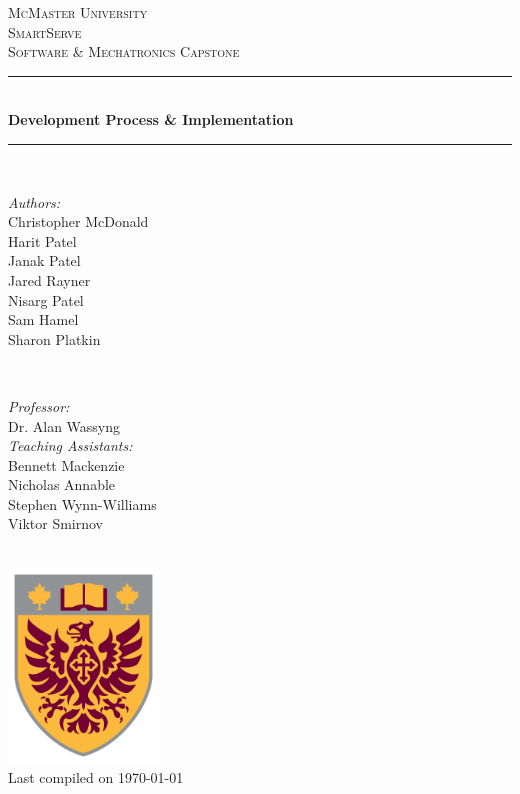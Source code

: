 \documentclass[11pt]{article}
\begin{document}
\begin{titlepage}
	\newcommand{\HRule}{\rule{\linewidth}{0.2mm}}
	\begin{center}
	\textsc{\LARGE McMaster University}\\[1.5cm]
	
	\textsc{\Large SmartServe}\\[0.5cm]
	\textsc{\large Software \& Mechatronics Capstone}\\[0.5cm] 

	\HRule\\[0.4cm]
		{\huge\bfseries Development Process \& Implementation}\\[0.4cm]
	\HRule\\[0.4cm]
	
	\begin{minipage}[t][][t]{0.5\textwidth}
		\begin{flushleft} \large
			\emph{Authors:}\\
			Christopher McDonald\\
			Harit Patel \\
			Janak Patel \\
			Jared Rayner  \\
			Nisarg Patel  \\
			Sam Hamel \\
			Sharon Platkin \\
		\end{flushleft}
	\end{minipage}
	~
	\begin{minipage}[t][][t]{0.4\textwidth}
		\begin{flushright} \large
			\emph{Professor:} \\
			Dr. Alan Wassyng \\[0.4cm]
			\emph{Teaching Assistants:} \\
			Bennett Mackenzie \\ 
			Nicholas Annable \\ 
			Stephen Wynn-Williams \\ 
			Viktor Smirnov
		\end{flushright}
	\end{minipage}\\[2cm]
	
	\includegraphics[width=0.3\textwidth]{logo.png} \\
	{\large Last compiled on \today}
	\end{center}

\end{titlepage}
\end{document}
